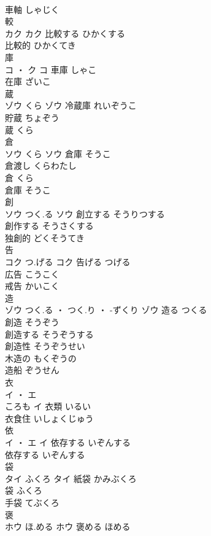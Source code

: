 \documentclass[8pt]{extreport}
\begin{document}
\begin{CJK}{UTF8}{min}
\\	車軸	しゃじく	
\\	較	
\\	カク		カク	比較する	ひかくする	
\\	比較的	ひかくてき	
\\	庫	
\\	コ ・ ク		コ	車庫	しゃこ	
\\	在庫	ざいこ	
\\	蔵	
\\	ゾウ	くら	ゾウ	冷蔵庫	れいぞうこ	
\\	貯蔵	ちょぞう	
\\	蔵	くら	
\\	倉	
\\	ソウ	くら	ソウ	倉庫	そうこ	
\\	倉渡し	くらわたし	
\\	倉	くら	
\\	倉庫	そうこ	
\\	創	
\\	ソウ	つく.る	ソウ	創立する	そうりつする	
\\	創作する	そうさくする	
\\	独創的	どくそうてき	
\\	告	
\\	コク	つ.げる	コク	告げる	つげる	
\\	広告	こうこく	
\\	戒告	かいこく	
\\	造	
\\	ゾウ	つく.る ・ つく.り ・ -ずくり	ゾウ	造る	つくる	
\\	創造	そうぞう	
\\	創造する	そうぞうする	
\\	創造性	そうぞうせい	
\\	木造の	もくぞうの	
\\	造船	ぞうせん	
\\	衣	
\\	イ ・ エ
\\	ころも	イ	衣類	いるい	
\\	衣食住	いしょくじゅう	
\\	依	
\\	イ ・ エ		イ	依存する	いぞんする	
\\	依存する	いぞんする	
\\	袋	
\\	タイ	ふくろ	タイ	紙袋	かみぶくろ	
\\	袋	ふくろ	
\\	手袋	てぶくろ	
\\	褒	
\\	ホウ	ほ.める	ホウ	褒める	ほめる	

\end{CJK}
\end{document}
